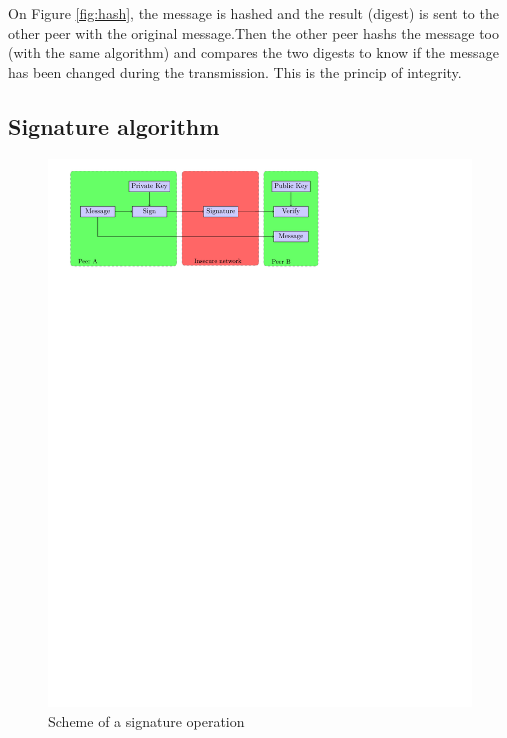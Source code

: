 On Figure \ref{fig:hash}, the message is hashed and the result (digest) is
sent to the other peer with the original message.\newline Then the other peer
hashs the message too (with the same algorithm) and compares the two digests to
know if the message has been changed during the transmission.\newline 
This is the princip of integrity.

\newpage

\subsection{Signature algorithm}
\label{intro_sign}

\begin{figure}[!ht]
\centering
\includegraphics[trim=2cm 22.25cm 7.5cm 0cm]{figures/signature.pdf}
\caption{Scheme of a signature operation\newline}
\label{fig:sign}

\end{figure}

